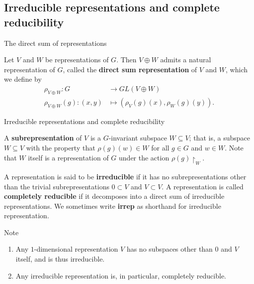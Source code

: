 \subsection{Irreducible representations and complete reducibility}
\begin{frame}{The direct sum of representations}
\begin{definition}
Let $V$ and $W$ be representations of $G$.  Then $V \oplus W$ admits a  natural representation of $G$, called the \textbf{direct sum representation} of $V$ and $W$, which we define by 
\begin{align*}
\rho_{V \oplus W} \colon G &\to GL(V \oplus W) \\
\rho_{V \oplus W}(g) \colon (x,y) &\mapsto (\rho_{V} (g)(x), \rho_{W}(g)(y)).
\end{align*}
\end{definition}
\end{frame}

\begin{frame}{Irreducible representations and complete reducibility}
\begin{definition} A \textbf{subrepresentation} of $V$ is a $G$-invariant subspace $W \subseteq V$; that is, a subspace $W \subseteq V$ with the property that $\rho(g) (w) \in W$ for all $g \in G$ and $w \in W$.  Note that $W$ itself is a representation of $G$ under the action $\rho(g) \restriction_W$.
\end{definition}
\begin{definition}
A representation is said to be \textbf{irreducible} if it has no subrepresentations other than the trivial subrepresentations $ 0 \subset V$ and $V \subset V$.  A representation is called \textbf{completely reducible} if it decomposes into a direct sum of irreducible representations.  We sometimes write \textbf{irrep} as shorthand for irreducible representation.
\end{definition}

\begin{block}{Note}
\begin{enumerate}
\item Any $1$-dimensional representation $V$ has no subspaces other than $0$ and $V$ itself, and is thus irreducible.
\item Any irreducible representation is, in particular, completely reducible.
\end{enumerate} \end{block}
\end{frame}

